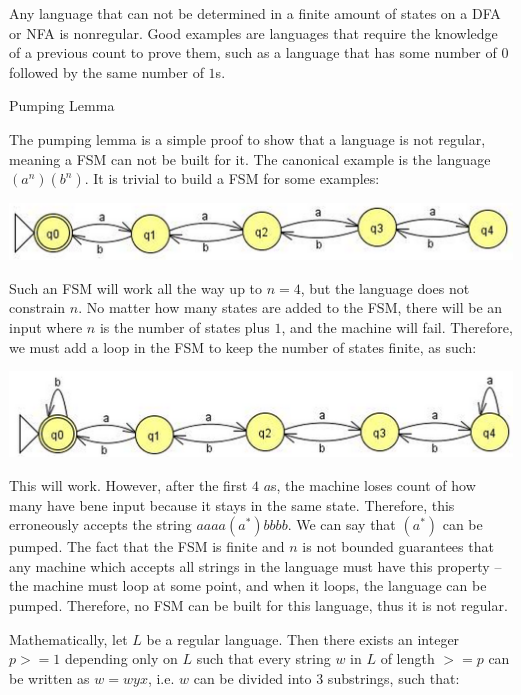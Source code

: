 \documentclass[8pt,landscape,legalpaper]{article}
\makeatletter
\renewcommand{\subsection}{\@startsection{subsection}{2}{0mm}
                                {-1explus -.5ex minus -.2ex}
                                {0.5ex plus .2ex}
                                {\normalfont\normalsize\bfseries}}
\makeatother
\begin{document}
\begin{multicols}{6}
Any language that can not be determined in a finite amount of states on a DFA or NFA is nonregular. Good examples are languages that require the knowledge of a previous count to prove them, such as a language that has some number of $0$ followed by the same number of $1$s.

\subsection{Pumping Lemma}

The pumping lemma is a simple proof to show that a language is not regular, meaning a FSM can not be built for it. The canonical example is the language $(a^n)(b^n)$. It is trivial to build a FSM for some examples:

\includegraphics[scale=0.25]{simple_pumping_fsm.png}

Such an FSM will work all the way up to $n = 4$, but the language does not constrain $n$. No matter how many states are added to the FSM, there will be an input where $n$ is the number of states plus $1$, and the machine will fail. Therefore, we must add a loop in the FSM to keep the number of states finite, as such:

\includegraphics[scale=0.25]{loop_pumping_fsm.png}

This will work. However, after the first $4$ $a$s, the machine loses count of how many have bene input because it stays in the same state. Therefore, this erroneously accepts the string $aaaa(a^*)bbbb$. We can say that $(a^*)$ can be pumped. The fact that the FSM is finite and $n$ is not bounded guarantees that any machine which accepts all strings in the language must have this property -- the machine must loop at some point, and when it loops, the language can be pumped. Therefore, no FSM can be built for this language, thus it is not regular.

Mathematically, let $L$ be a regular language. Then there exists an integer $p >= 1$ depending only on $L$ such that every string $w$ in $L$ of length $>= p$ can be written as $w = wyx$, i.e. $w$ can be divided into 3 substrings, such that:


\end{multicols}
\end{document}
